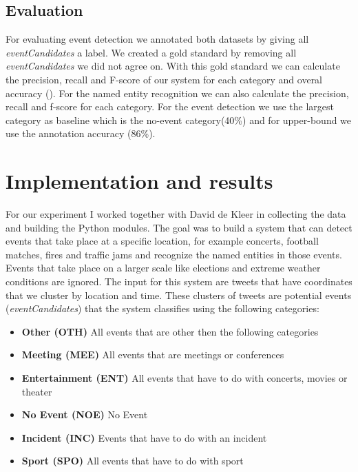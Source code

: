 \documentclass[
10pt, %
a4paper, %
oneside, %
headinclude,footinclude, %
BCOR5mm, %
]{scrartcl}
\begin{document}
\subsection{Evaluation}
For evaluating event detection we annotated both datasets by giving all \textit{eventCandidates} a label. We created a gold standard by removing all \textit{eventCandidates} we did not agree on. With this gold standard we can calculate the precision, recall and F-score of our system for each category and overal accuracy (\citealt{manning2008introduction}). For the named entity recognition we can also calculate the precision, recall and f-score for each category.  For the event detection we use the largest category as baseline which is the no-event category(40\%) and for upper-bound we use the annotation accuracy (86\%).

\newpage
\section{Implementation and results}
For our experiment I worked together with David de Kleer in collecting the data and building the Python modules. The goal was to build a system that can detect events that take place at a specific location, for example concerts, football matches, fires and traffic jams and recognize the named entities in those events.  Events that take place on a larger scale like elections and extreme weather conditions are ignored. The input for this system are tweets that have coordinates that we cluster by location and time. These clusters of tweets are potential events (\textit{eventCandidates}) that the system classifies using the following categories: \newline

\begin{itemize}[noitemsep] %
\item \textbf{Other (OTH)} All events that are other then the following categories 
\item \textbf{Meeting (MEE)} All events that are meetings or conferences 
\item \textbf{Entertainment (ENT)} All events that have to do with concerts, movies or theater
\item \textbf{No Event (NOE)} No Event
\item \textbf{Incident (INC)} Events that have to do with an incident
\item \textbf{Sport (SPO)} All events that have to do with sport 
\end{itemize}
\end{document}
